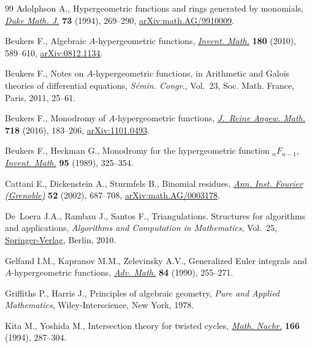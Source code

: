 \documentclass[11pt]{article}
\numberwithin{equation}{section}
\numberwithin{equation}{section}
\begin{document}
\begin{thebibliography}{99}
Adolphson A., Hypergeometric functions and rings generated by monomials,
 \href{https://doi.org/10.1215/S0012-7094-94-07313-4}{\textit{Duke Math. J.}} \textbf{73} (1994), 269--290,
 \href{https://arxiv.org/abs/math.AG/9910009}{arXiv:math.AG/9910009}.

Beukers F., Algebraic {$A$}-hypergeometric functions, \href{https://doi.org/10.1007/s00222-010-0238-y}{\textit{Invent. Math.}}
 \textbf{180} (2010), 589--610, \href{https://arxiv.org/abs/0812.1134}{arXiv:0812.1134}.

Beukers F., Notes on {$A$}-hypergeometric functions, in Arithmetic and {G}alois
 theories of differential equations, \textit{S\'emin. Congr.}, Vol.~23, Soc.
 Math. France, Paris, 2011, 25--61.

Beukers F., Monodromy of {$A$}-hypergeometric functions, \href{https://doi.org/10.1515/crelle-2014-0054}{\textit{J.~Reine
 Angew. Math.}} \textbf{718} (2016), 183--206, \href{https://arxiv.org/abs/1101.0493}{arXiv:1101.0493}.

Beukers F., Heckman G., Monodromy for the hypergeometric function
 {$_nF_{n-1}$}, \href{https://doi.org/10.1007/BF01393900}{\textit{Invent. Math.}} \textbf{95} (1989), 325--354.

Cattani E., Dickenstein A., Sturmfels B., Binomial residues, \href{https://doi.org/10.5802/aif.1898}{\textit{Ann. Inst.
 Fourier (Grenoble)}} \textbf{52} (2002), 687--708, \href{https://arxiv.org/abs/math.AG/0003178}{arXiv:math.AG/0003178}.

De~Loera J.A., Rambau J., Santos F., Triangulations. Structures for algorithms
 and applications, \textit{Algorithms and Computation in Mathematics},
 Vol.~25, \href{https://doi.org/10.1007/978-3-642-12971-1}{Springer-Verlag}, Berlin, 2010.

Gelfand I.M., Kapranov M.M., Zelevinsky A.V., Generalized {E}uler integrals and
 {$A$}-hypergeometric functions, \href{https://doi.org/10.1016/0001-8708(90)90048-R}{\textit{Adv. Math.}} \textbf{84} (1990),
 255--271.

Griffiths P., Harris J., Principles of algebraic geometry, \textit{Pure and Applied
 Mathematics}, Wiley-Interscience, New York, 1978.

Kita M., Yoshida M., Intersection theory for twisted cycles, \href{https://doi.org/10.1002/mana.19941660122}{\textit{Math.
 Nachr.}} \textbf{166} (1994), 287--304.

\end{thebibliography}
\end{document}
